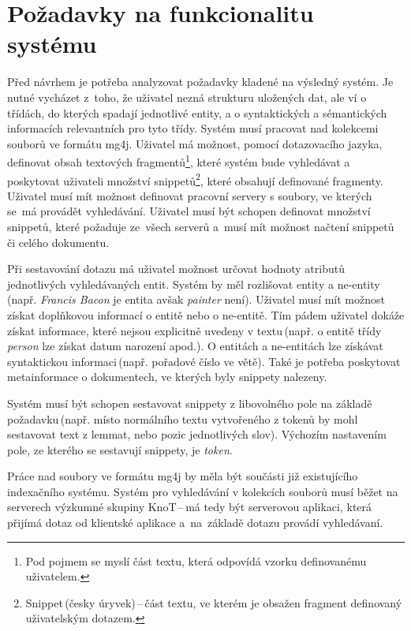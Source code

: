 \section{Požadavky na funkcionalitu systému}
\label{taskDescriptin}
Před návrhem je potřeba analyzovat požadavky kladené na výsledný systém. Je nutné vycházet z~toho, že uživatel nezná strukturu uložených dat, ale ví o třídách, do kterých spadají jednotlivé entity, a o syntaktických a sémantických informacích relevantních pro tyto třídy. Systém musí pracovat nad kolekcemi souborů ve formátu mg4j. Uživatel má možnost, pomocí dotazovacího jazyka, definovat obsah textových fragmentů\footnote{Pod pojmem  se myslí část textu, která odpovídá vzorku definovanému uživatelem.}, které systém bude vyhledávat a poskytovat uživateli množství snippetů\footnote{Snippet\,(česky úryvek)\,--\,část textu, ve kterém je obsažen fragment definovaný uživatelským dotazem.}, které obsahují definované fragmenty. Uživatel musí mít možnost definovat pracovní servery s  soubory, ve kterých se~má provádět vyhledávání. Uživatel musí být schopen definovat množství snippetů, které požaduje ze~všech serverů a~musí mít možnost načtení  snippetů či celého dokumentu.

Při sestavování dotazu má uživatel možnost určovat hodnoty atributů jednotlivých vyhledávaných entit. Systém by měl rozlišovat entity a ne-entity\,(např. \emph{Francis Bacon} je entita avšak \emph{painter} není). Uživatel musí mít možnost získat doplňkovou informací o entitě nebo o ne-entitě. Tím pádem uživatel dokáže získat informace, které nejsou explicitně uvedeny v textu\,(např. o entitě třídy \emph{person} lze získat datum narození apod.). O entitách a ne-entitách lze získávat syntaktickou informaci\,(např. pořadové číslo ve větě). Také je potřeba poskytovat metainformace o dokumentech, ve kterých byly snippety nalezeny.

Systém musí být schopen sestavovat snippety z libovolného pole na základě požadavku\,(např. místo normálního textu vytvořeného z tokenů by mohl sestavovat text z lemmat, nebo pozic jednotlivých slov). Výchozím nastavením pole, ze kterého se sestavují snippety, je \emph{token}.

Práce nad soubory ve formátu mg4j by měla být součásti již existujícího indexačního systému. Systém pro vyhledávání v kolekcích  souborů musí běžet na serverech výzkumné skupiny KnoT\,--\,má tedy být serverovou aplikaci, která přijímá dotaz od klientské aplikace a~na~základě dotazu provádí vyhledávaní.  

